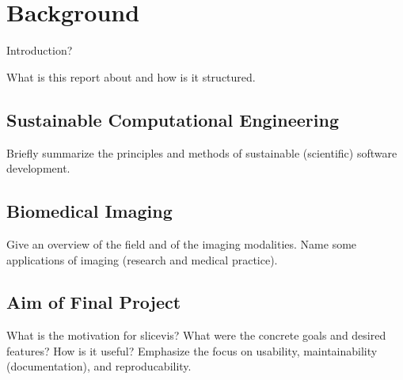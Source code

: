 \chapter{Background}

Introduction?

What is this report about and how is it structured.

\section{Sustainable Computational Engineering}

Briefly summarize the principles and methods of sustainable (scientific) software development.

\section{Biomedical Imaging}

Give an overview of the field and of the imaging modalities. Name some applications of imaging (research and medical practice).

\section{Aim of Final Project}

What is the motivation for slicevis?
What were the concrete goals and desired features?
How is it useful?
Emphasize the focus on usability, maintainability (documentation), and reproducability.